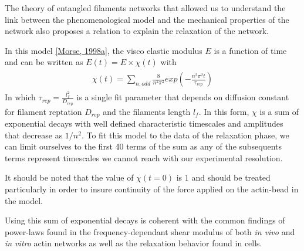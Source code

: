 \documentclass[A4paperpaper,11pt,english]{sphinxmanual}
\begin{document}
The theory of entangled filaments networks that allowed us to understand the link between the phenomenological
model and the mechanical properties of the network also proposes a relation to
explain the relaxation of the network.

In this model {\hyperref[index-latex:morse1998a]{{[}Morse,  1998a{]}}}, the visco elastic modulus  \(E\) is a function of time
and can be written as \(E(t) = E\times \chi(t)\) with
\label{index-latex:equation-chi}\begin{gather}
\begin{split}\chi(t)=\sum_{n, odd} \frac{8}{n^2 \pi^2}exp\left(- \frac{n^2\pi^2 t}{ \tau_{rep}} \right)\end{split}\label{index-latex-chi}
\end{gather}
In which \(\tau_{rep} = \frac{l_f^2}{D_{rep}}\) is a single fit parameter
that depends on diffusion constant for filament reptation \(D_{rep}\) and the
filaments length \(l_f\). In this form, \(\chi\) is a sum of
exponential decays with well defined characteristic timescales and amplitudes
that decrease as \(1/n^2\). To fit this model to the data of the
relaxation phase, we can limit ourselves to the first 40 terms of the sum as
any of the subsequents terms represent timescales we cannot reach with our
experimental resolution.

It should be noted that the value of \(\chi(t=0)\) is 1 and should be
treated particularly in order to insure continuity of the force applied on the
actin-bead in the model.

Using this sum of exponential decays is coherent with the common findings of
power-laws found in the frequency-dependant shear modulus of both \emph{in vivo} and \emph{in vitro} actin
networks as well as the relaxation behavior found in cells.
\end{document}

